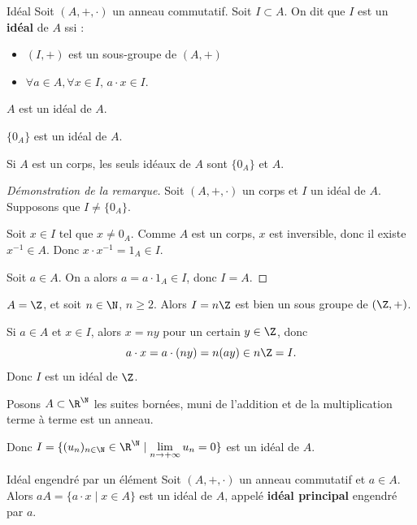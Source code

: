 \lvspace \avspace \begin{definition}{Idéal}{}
    Soit $(A, +, \cdot)$ un anneau commutatif. Soit $I \subset A$. On dit que $I$ est un \textbf{idéal} de $A$ ssi :
    \begin{itemize}
        \item $(I, +)$ est un sous-groupe de $(A, +)$ 
        \item $\forall a \in A, \forall x \in I, \, a \cdot x \in I$.
    \end{itemize}
\end{definition}

\begin{exemple}
    $A$ est un idéal de $A$.

    $\{0_A\}$ est un idéal de $A$.
\end{exemple}

\begin{remarque}
    Si $A$ est un corps, les seuls idéaux de $A$ sont $\{0_A\}$ et $A$.
\end{remarque}

\begin{proof}[Démonstration de la remarque]

    Soit $(A, +, \cdot)$ un corps et $I$ un idéal de $A$. Supposons que $I \neq \{0_A\}$.

    Soit $x \in I$ tel que $x \neq 0_A$. Comme $A$ est un corps, $x$ est inversible, donc
    il existe $x^{-1} \in A$. Donc $x \cdot x^{-1} = 1_A \in I$.

    Soit $a \in A$. On a alors $a = a \cdot 1_A \in I$, donc $I = A$.
\end{proof}

\begin{exemple}
    $A = \Z$, et soit $n \in \N$, $n \geqslant 2$. Alors $I = n\Z$ est bien un sous groupe de $(\Z, +)$.

    Si $a \in A$ et $x \in I$, alors $x = ny$ pour un certain $y \in \Z$, donc
    \[
        a \cdot x = a \cdot (ny) = n(ay) \in n\Z = I.
    \]
    Donc $I$ est un idéal de $\Z$.

    \lvspace Posons $A \subset \R^\N$ les suites bornées, muni de l'addition et de la multiplication terme à terme
    est un anneau.

    Donc $I = \{(u_n)_{n \in \N} \in \R^\N \mid \lim\limits_{n \to +\infty} u_n = 0\}$ est un idéal de $A$.


\end{exemple}

\begin{theoreme}{Idéal engendré par un élément}{}
    Soit $(A, +, \cdot)$ un anneau commutatif et $a \in A$. Alors
    $aA = \{a \cdot x \mid x \in A\}$ est un idéal de $A$, appelé
    \textbf{idéal principal} engendré par $a$.
    
\end{theoreme}

